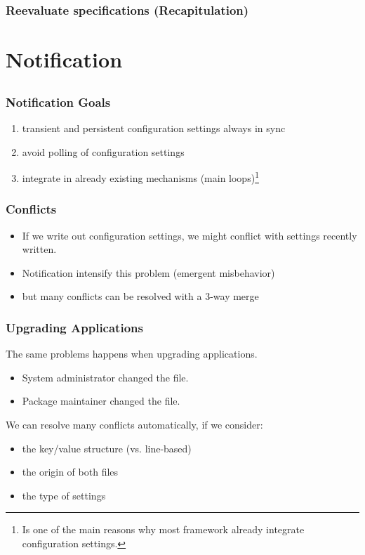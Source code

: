 \begin{frame}
	\frametitle{Reevaluate specifications (Recapitulation)}

	\pause

\end{frame}


\section{Notification}

\subsection{}

\begin{frame}
	\frametitle{Notification Goals}

	\pause

	\begin{enumerate}
	\item transient and persistent configuration settings always in sync
	\item avoid polling of configuration settings
	\item integrate in already existing mechanisms (main loops)\footnote{Is one of the main reasons why most framework already integrate configuration settings.}
	\end{enumerate}
\end{frame}

\begin{frame}
	\frametitle{Conflicts}

	\pause

	\begin{itemize}
	\item If we write out configuration settings, we might conflict with settings recently written.
	\item Notification intensify this problem (emergent misbehavior)
	\item but many conflicts can be resolved with a 3-way merge
	\end{itemize}
\end{frame}

\begin{frame}
	\frametitle{Upgrading Applications}

	The same problems happens when upgrading applications.

	\begin{itemize}
	\item System administrator changed the file.
	\item Package maintainer changed the file.
	\end{itemize}

	We can resolve many conflicts automatically, if we consider:
	\begin{itemize}
	\item the key/value structure (vs. line-based)
	\item the origin of both files
	\item the type of settings
	\end{itemize}
\end{frame}

